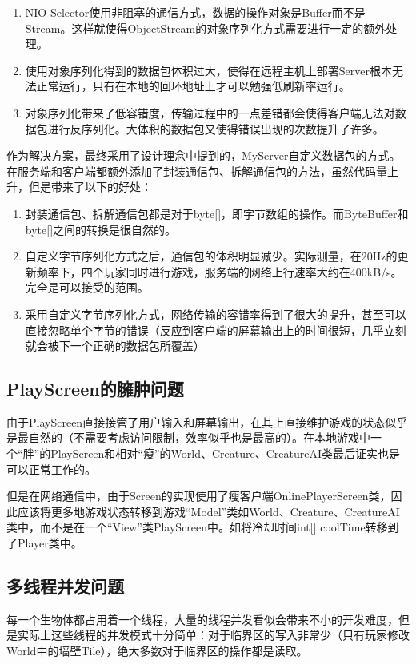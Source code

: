 \documentclass{SCIS2022cn}
\begin{document}
\begin{enumerate}
    \item NIO Selector使用非阻塞的通信方式，数据的操作对象是Buffer而不是Stream。这样就使得ObjectStream的对象序列化方式需要进行一定的额外处理。
    \item 使用对象序列化得到的数据包体积过大，使得在远程主机上部署Server根本无法正常运行，只有在本地的回环地址上才可以勉强低刷新率运行。
    \item 对象序列化带来了低容错度，传输过程中的一点差错都会使得客户端无法对数据包进行反序列化。大体积的数据包又使得错误出现的次数提升了许多。
\end{enumerate}

作为解决方案，最终采用了设计理念中提到的，MyServer自定义数据包的方式。在服务端和客户端都额外添加了封装通信包、拆解通信包的方法，虽然代码量上升，但是带来了以下的好处：
\begin{enumerate}
    \item 封装通信包、拆解通信包都是对于byte[]，即字节数组的操作。而ByteBuffer和byte[]之间的转换是很自然的。
    \item 自定义字节序列化方式之后，通信包的体积明显减少。实际测量，在20Hz的更新频率下，四个玩家同时进行游戏，服务端的网络上行速率大约在400kB/s。完全是可以接受的范围。
    \item 采用自定义字节序列化方式，网络传输的容错率得到了很大的提升，甚至可以直接忽略单个字节的错误（反应到客户端的屏幕输出上的时间很短，几乎立刻就会被下一个正确的数据包所覆盖）
\end{enumerate}

\subsection{PlayScreen的臃肿问题}
由于PlayScreen直接接管了用户输入和屏幕输出，在其上直接维护游戏的状态似乎是最自然的（不需要考虑访问限制，效率似乎也是最高的）。在本地游戏中一个“胖”的PlayScreen和相对“瘦”的World、Creature、CreatureAI类最后证实也是可以正常工作的。

但是在网络通信中，由于Screen的实现使用了瘦客户端OnlinePlayerScreen类，因此应该将更多地游戏状态转移到游戏“Model”类如World、Creature、CreatureAI类中，而不是在一个“View”类PlayScreen中。如将冷却时间int[] coolTime转移到了Player类中。

\subsection{多线程并发问题}
每一个生物体都占用着一个线程，大量的线程并发看似会带来不小的开发难度，但是实际上这些线程的并发模式十分简单：对于临界区的写入非常少（只有玩家修改World中的墙壁Tile），绝大多数对于临界区的操作都是读取。
\end{document}
